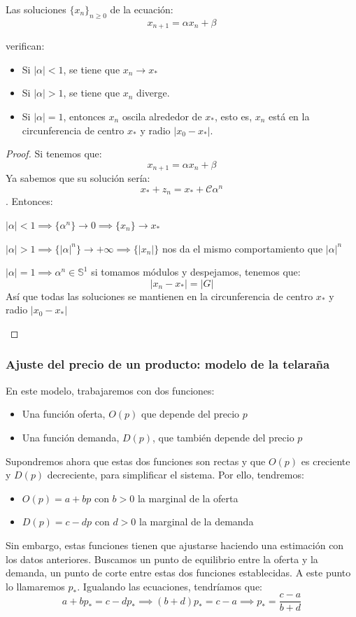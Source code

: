\begin{nth}
	Las soluciones $\{x_n\}_{n\geq0}$ de la ecuación:
\[
x_{n+1} = \alpha x_n + \beta
\]

verifican:

\begin{itemize}
\item Si $|\alpha| < 1$, se tiene que ${x_n} \to x_*$
\item Si $|\alpha| > 1$, se tiene que ${x_n}$ diverge.
\item Si $|\alpha| = 1$, entonces ${x_n}$ oscila alrededor de $x_*$, esto es, $x_n$ está en la circunferencia de centro $x_*$ y radio $|x_0 - x_*|$.
\end{itemize}\vspace{0.5cm}

	\begin{proof}
	Si tenemos que:
	\[
x_{n+1}= \alpha x_n + \beta
\]
Ya sabemos que su solución sería:
\[
x_* +z_n = x_* + \mathcal{C}\alpha^n
\]. Entonces:
\begin{nlist}
	\item $|\alpha|< 1 \implies \{\alpha^n\}\to 0 \implies \{x_n\} \to x_*$
	\item $|\alpha|> 1 \implies \{|\alpha|^n\}\to +\infty \implies \{|x_n|\}$ nos da el mismo comportamiento que $|\alpha|^n$
	\item $|\alpha| = 1 \implies \alpha^n \in \mathbb{S}^1$ si tomamos módulos y despejamos, tenemos que:
	\[
	|x_n -x_*| = |G|
	\]
	Así que todas las soluciones se mantienen en la circunferencia de centro $x_*$ y radio $|x_0-x_*|$
\end{nlist}
\end{proof}
\end{nth}

\subsubsection{Ajuste del precio de un producto: modelo de la telaraña}
En este modelo, trabajaremos con dos funciones:
\begin{itemize}
	\item Una función oferta, $O(p)$ que depende del precio $p$
	\item Una función demanda, $D(p)$, que también depende del precio $p$
\end{itemize}

Supondremos ahora que estas dos funciones son rectas y que $O(p)$ es creciente y $D(p)$ decreciente, para simplificar el sistema. Por ello, tendremos:
\begin{itemize}
\item $O(p) = a+bp $ con $b>0$ la marginal de la oferta
\item $D(p) = c -dp $ con $d> 0$ la marginal de la demanda

\end{itemize}
Sin embargo, estas funciones tienen que ajustarse haciendo una estimación con los datos anteriores. Buscamos un punto de equilibrio entre la oferta y la demanda, un punto de corte entre estas dos funciones establecidas. A este punto lo llamaremos $p_*$. Igualando las ecuaciones, tendríamos que:
\[
 a+bp_*=c-dp_*\implies(b+d)p_*= c-a \implies p_* = \frac{c-a}{b+d}
\]

